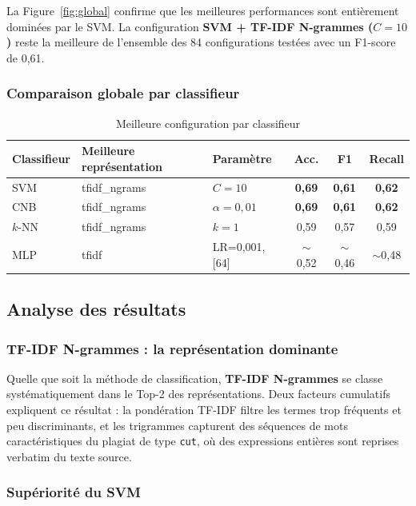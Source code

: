 \documentclass[12pt,a4paper]{article}
\begin{document}
La Figure~\ref{fig:global} confirme que les meilleures performances sont entièrement dominées par le SVM. La configuration \textbf{SVM + TF-IDF N-grammes ($C=10$)} reste la meilleure de l'ensemble des 84 configurations testées avec un F1-score de 0,61.

\subsubsection{Comparaison globale par classifieur}

\begin{table}[H]
\centering
\caption{Meilleure configuration par classifieur}
\label{tab:synthese}
\begin{tabular}{lllccc}
\toprule
\textbf{Classifieur} & \textbf{Meilleure représentation} & \textbf{Paramètre} & \textbf{Acc.} & \textbf{F1} & \textbf{Recall} \\
\midrule
SVM    & tfidf\_ngrams & $C=10$           & \textbf{0,69} & \textbf{0,61} & \textbf{0,62} \\
CNB    & tfidf\_ngrams & $\alpha=0{,}01$  & \textbf{0,69} & \textbf{0,61} & \textbf{0,62} \\
$k$-NN & tfidf\_ngrams & $k=1$            & 0,59 & 0,57 & 0,59 \\
MLP    & tfidf         & LR=0,001, [64]   & $\sim$0,52 & $\sim$0,46 & $\sim$0,48 \\
\bottomrule
\end{tabular}
\end{table}

\subsection{Analyse des résultats}

\subsubsection{TF-IDF N-grammes : la représentation dominante}

Quelle que soit la méthode de classification, \textbf{TF-IDF N-grammes} se classe systématiquement dans le Top-2 des représentations. Deux facteurs cumulatifs expliquent ce résultat : la pondération TF-IDF filtre les termes trop fréquents et peu discriminants, et les trigrammes capturent des séquences de mots caractéristiques du plagiat de type \texttt{cut}, où des expressions entières sont reprises verbatim du texte source.

\subsubsection{Supériorité du SVM}
\end{document}
